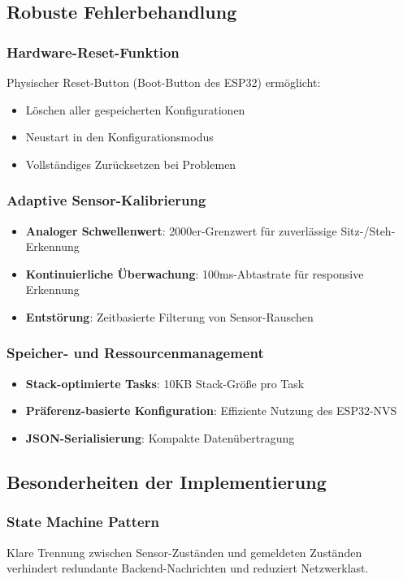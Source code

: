 \subsection{Robuste Fehlerbehandlung}

\subsubsection{Hardware-Reset-Funktion}
Physischer Reset-Button (Boot-Button des ESP32) ermöglicht:
\begin{itemize}
\item Löschen aller gespeicherten Konfigurationen
\item Neustart in den Konfigurationsmodus
\item Vollständiges Zurücksetzen bei Problemen
\end{itemize}

\subsubsection{Adaptive Sensor-Kalibrierung}
\begin{itemize}
\item \textbf{Analoger Schwellenwert}: 2000er-Grenzwert für zuverlässige Sitz-/Steh-Erkennung
\item \textbf{Kontinuierliche Überwachung}: 100ms-Abtastrate für responsive Erkennung
\item \textbf{Entstörung}: Zeitbasierte Filterung von Sensor-Rauschen
\end{itemize}

\subsubsection{Speicher- und Ressourcenmanagement}
\begin{itemize}
\item \textbf{Stack-optimierte Tasks}: 10KB Stack-Größe pro Task
\item \textbf{Präferenz-basierte Konfiguration}: Effiziente Nutzung des ESP32-NVS
\item \textbf{JSON-Serialisierung}: Kompakte Datenübertragung
\end{itemize}

\subsection{Besonderheiten der Implementierung}

\subsubsection{State Machine Pattern}
Klare Trennung zwischen Sensor-Zuständen und gemeldeten Zuständen verhindert redundante Backend-Nachrichten und reduziert Netzwerklast.

